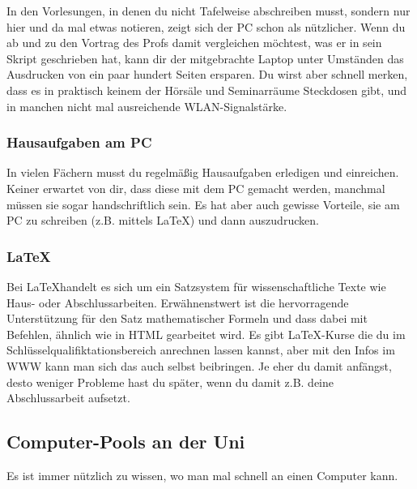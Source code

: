 			In den Vorlesungen, in denen du nicht Tafelweise abschreiben musst, sondern nur hier und da mal etwas notieren, zeigt sich der PC schon als nützlicher. Wenn du ab und zu den Vortrag des Profs damit vergleichen möchtest, was er in sein Skript geschrieben hat, kann dir der mitgebrachte Laptop unter Umständen das Ausdrucken von ein paar hundert Seiten ersparen. Du wirst aber schnell merken, dass es in praktisch keinem der Hörsäle und Seminarräume Steckdosen gibt, und in manchen nicht mal ausreichende WLAN-Signalstärke.

		\subsubsection{Hausaufgaben am PC}
			In vielen Fächern musst du regelmäßig Hausaufgaben erledigen und einreichen. Keiner erwartet von dir, dass diese mit dem PC gemacht werden, manchmal müssen sie sogar handschriftlich sein. Es hat aber auch gewisse Vorteile, sie am PC zu schreiben (z.B. mittels \LaTeX) und dann auszudrucken. 

		\subsubsection{\LaTeX}
			Bei \LaTeX handelt es sich um ein Satzsystem für wissenschaftliche Texte wie Haus- oder Abschlussarbeiten. Erwähnenstwert ist die hervorragende Unterstützung für den Satz mathematischer Formeln und dass dabei mit Befehlen, ähnlich wie in HTML gearbeitet wird. Es gibt \LaTeX-Kurse die du im Schlüsselqualifiktationsbereich anrechnen lassen kannst, aber mit den Infos im WWW kann man sich das auch selbst beibringen. Je eher du damit anfängst, desto weniger Probleme hast du später, wenn du damit z.B. deine Abschlussarbeit aufsetzt.

		\subsection{Computer-Pools an der Uni}
			Es ist immer nützlich zu wissen, wo man mal schnell an einen Computer kann.

